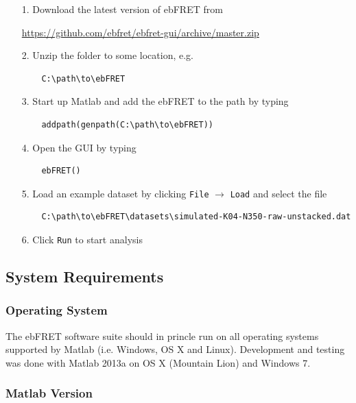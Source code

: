 \documentclass[12pt,article,oldfontcommands]{memoir}
\newcommand{\indt}{\qquad}
\begin{document}
\begin{itemize}
\item[1.] Download the latest version of ebFRET from

\indt\url{https://github.com/ebfret/ebfret-gui/archive/master.zip}

\item[2.] Unzip the folder to some location, e.g. 
\begin{verbatim}
    C:\path\to\ebFRET
\end{verbatim}

\item[3.] Start up Matlab and add the ebFRET to the path by typing
\begin{verbatim}
    addpath(genpath(C:\path\to\ebFRET))
\end{verbatim}
\item[4.] Open the GUI by typing 
\begin{verbatim}
    ebFRET()
\end{verbatim}

\item[5.] Load an example dataset by clicking \texttt{File} $\to$ \texttt{Load} and select the file 
\begin{verbatim}
    C:\path\to\ebFRET\datasets\simulated-K04-N350-raw-unstacked.dat
\end{verbatim}

\item[6.] Click \texttt{Run} to start analysis

\end{itemize}

\subsection{System Requirements}

\subsubsection{Operating System} 

The ebFRET software suite should in princle run on all operating systems supported by Matlab (i.e. Windows, OS X and Linux). Development and testing was done with Matlab 2013a on OS X (Mountain Lion) and Windows 7.

\subsubsection{Matlab Version} 
\end{document}
